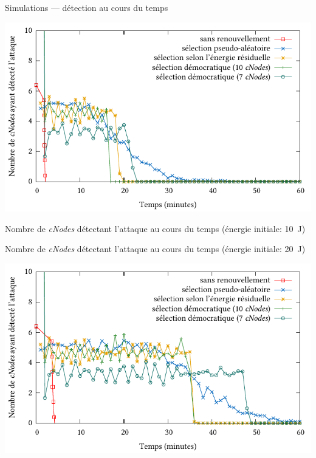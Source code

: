 \documentclass[aspectratio=43]{beamer} %
\newcommand\cns{\textit{cNodes}\xspace}
\begin{document}
\begin{frame}{Simulations --- détection au cours du temps}
  \begin{minipage}{.65\textwidth}
    \includegraphics[height=.48\textheight]{Figs/plot_sd_detectionXtime-minute_10J.pdf}
  \end{minipage}
  \begin{minipage}[c][.48\textheight][t]{.34\textwidth}
    \raggedright\medskip
    Nombre de \cns détectant l'attaque au cours du temps (énergie initiale: 10~J)
  \end{minipage}
  \begin{minipage}[c][.48\textheight][b]{.34\textwidth}
    \raggedright
    Nombre de \cns détectant l'attaque au cours du temps (énergie initiale: 20~J)
    \bigskip
  \end{minipage}
  \begin{minipage}{.65\textwidth}
    \raggedleft
    \includegraphics[height=.48\textheight]{Figs/plot_sd_detectionXtime-minute_20J.pdf}
  \end{minipage}
\end{frame}
\end{document}
